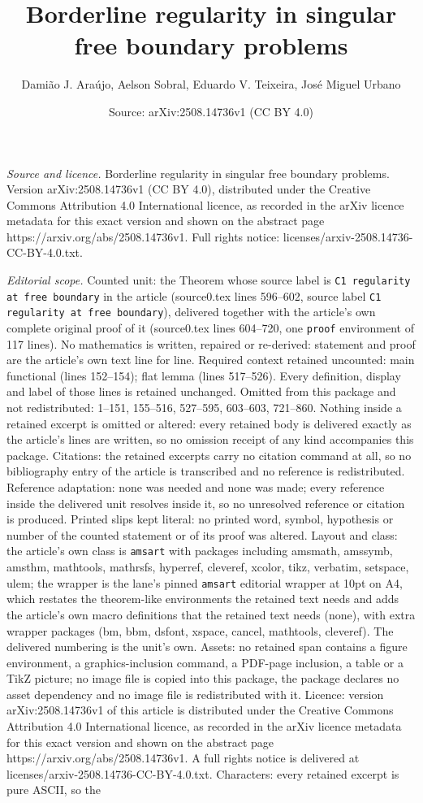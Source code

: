 \documentclass[10pt,a4paper]{amsart}
\title[Borderline regularity in singular free boundary problems]{Borderline regularity in singular free boundary problems}
\author{Dami\~ao J. Ara\'ujo, Aelson Sobral, Eduardo V. Teixeira, Jos\'e Miguel Urbano}
\date{Source: arXiv:2508.14736v1 (CC BY 4.0)}
\begin{document}
\maketitle

\noindent\emph{Source and licence.} Borderline regularity in singular free boundary problems. Version arXiv:2508.14736v1 (CC BY 4.0), distributed under the Creative Commons Attribution 4.0 International licence, as recorded in the arXiv licence metadata for this exact version and shown on the abstract page https://arxiv.org/abs/2508.14736v1. Full rights notice: licenses/arxiv-2508.14736-CC-BY-4.0.txt.\par\smallskip

\noindent\textit{Editorial scope.} Counted unit: the Theorem whose source label is \texttt{C1 regularity at free boundary} in the article (source0.tex lines 596--602, source label \texttt{C1 regularity at free boundary}), delivered together with the article's own complete original proof of it (source0.tex lines 604--720, one \texttt{proof} environment of 117 lines). No mathematics is written, repaired or re-derived: statement and proof are the article's own text line for line. Required context retained uncounted: main functional (lines 152--154); flat lemma (lines 517--526). Every definition, display and label of those lines is retained unchanged. Omitted from this package and not redistributed: 1--151, 155--516, 527--595, 603--603, 721--860. Nothing inside a retained excerpt is omitted or altered: every retained body is delivered exactly as the article's lines are written, so no omission receipt of any kind accompanies this package. Citations: the retained excerpts carry no citation command at all, so no bibliography entry of the article is transcribed and no reference is redistributed. Reference adaptation: none was needed and none was made; every reference inside the delivered unit resolves inside it, so no unresolved reference or citation is produced. Printed slips kept literal: no printed word, symbol, hypothesis or number of the counted statement or of its proof was altered. Layout and class: the article's own class is \texttt{amsart} with packages including amsmath, amssymb, amsthm, mathtools, mathrsfs, hyperref, cleveref, xcolor, tikz, verbatim, setspace, ulem; the wrapper is the lane's pinned \texttt{amsart} editorial wrapper at 10pt on A4, which restates the theorem-like environments the retained text needs and adds the article's own macro definitions that the retained text needs (none), with extra wrapper packages (bm, bbm, dsfont, xspace, cancel, mathtools, cleveref). The delivered numbering is the unit's own. Assets: no retained span contains a figure environment, a graphics-inclusion command, a PDF-page inclusion, a table or a TikZ picture; no image file is copied into this package, the package declares no asset dependency and no image file is redistributed with it. Licence: version arXiv:2508.14736v1 of this article is distributed under the Creative Commons Attribution 4.0 International licence, as recorded in the arXiv licence metadata for this exact version and shown on the abstract page https://arxiv.org/abs/2508.14736v1. A full rights notice is delivered at licenses/arxiv-2508.14736-CC-BY-4.0.txt. Characters: every retained excerpt is pure ASCII, so the 
\end{document}
